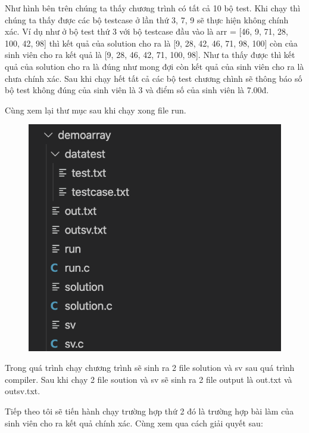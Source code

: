 \documentclass[12pt,a4paper]{article}
\begin{document}
Như hình bên trên chúng ta thấy chương trình có tất cả 10 bộ test. Khi chạy thì chúng ta thấy được các bộ testcase ở lần thứ 3, 7, 9 sẽ thực hiện không chính xác. Ví dụ như ở bộ test thứ 3 với bộ testcase đầu vào là arr = [46, 9, 71, 28, 100, 42, 98] thì kết quả của solution cho ra là [9, 28, 42, 46, 71, 98, 100] còn của sinh viên cho ra kết quả là [9, 28, 46, 42, 71, 100, 98]. Như ta thấy được thì kết quả của solution cho ra là đúng như mong đợi còn kết quả của sinh viên cho ra là chưa chính xác. Sau khi chạy hết tất cả các bộ test chương chình sẽ thông báo số bộ test không đúng của sinh viên là 3 và điểm số của sinh viên là 7.00đ. \newpage

Cùng xem lại thư mục sau khi chạy xong file run.

\begin{figure}[ht]
\begin{center}
\includegraphics[scale=.3]{hinhanh/cautrucsauchayrunarray.png}
\end{center}
\end{figure}

Trong quá trình chạy chương trình sẽ sinh ra 2 file solution và sv sau quá trình compiler. Sau khi chạy 2 file soution và sv sẽ sinh ra 2 file output là out.txt và outsv.txt.

Tiếp theo tôi sẽ tiến hành chạy trường hợp thứ 2 đó là trường hợp bài làm của sinh viên cho ra kết quả chính xác. Cùng xem qua cách giải quyết sau:
\end{document}
